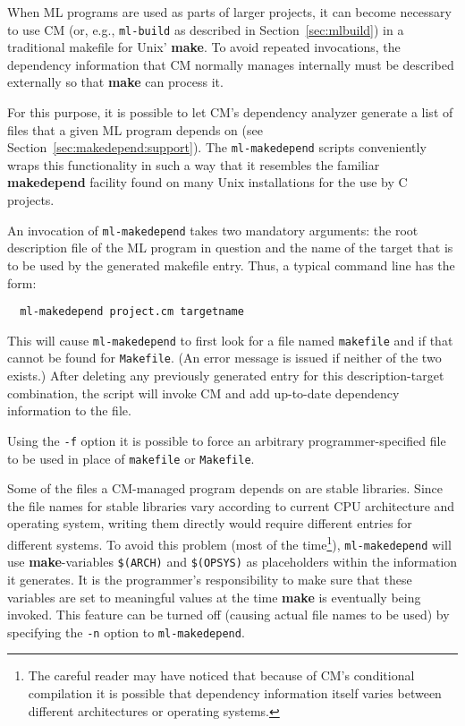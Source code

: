\documentclass[titlepage,letterpaper]{article}
\begin{document}
When ML programs are used as parts of larger projects, it can become
necessary to use CM (or, e.g., {\tt ml-build} as described in
Section~\ref{sec:mlbuild}) in a traditional makefile for Unix' {\bf
make}.  To avoid repeated invocations, the dependency information that
CM normally manages internally must be described externally so that
{\bf make} can process it.

For this purpose, it is possible to let CM's dependency analyzer
generate a list of files that a given ML program depends on (see
Section~\ref{sec:makedepend:support}).  The {\tt ml-makedepend}
scripts conveniently wraps this functionality in such a way that it
resembles the familiar {\bf makedepend} facility found on many Unix
installations for the use by C projects.

An invocation of {\tt ml-makedepend} takes two mandatory arguments:
the root description file of the ML program in question and the name
of the target that is to be used by the generated makefile entry.
Thus, a typical command line has the form:

\begin{verbatim}
  ml-makedepend project.cm targetname
\end{verbatim}

This will cause {\tt ml-makedepend} to first look for a file named
{\tt makefile} and if that cannot be found for {\tt Makefile}.  (An
error message is issued if neither of the two exists.)  After deleting
any previously generated entry for this description-target
combination, the script will invoke CM and add up-to-date dependency
information to the file.

Using the {\tt -f} option it is possible to force an arbitrary
programmer-specified file to be used in place of {\tt makefile} or
{\tt Makefile}.

Some of the files a CM-managed program depends on are stable
libraries.  Since the file names for stable libraries vary according
to current CPU architecture and operating system, writing them
directly would require different entries for different systems.  To
avoid this problem (most of the time\footnote{The careful reader may
have noticed that because of CM's conditional compilation it is
possible that dependency information itself varies between different
architectures or operating systems.}), {\tt ml-makedepend} will use
{\bf make}-variables {\tt \$(ARCH)} and {\tt \$(OPSYS)} as
placeholders within the information it generates.  It is the
programmer's responsibility to make sure that these variables are set
to meaningful values at the time {\bf make} is eventually being
invoked.  This feature can be turned off (causing actual file names to
be used) by specifying the {\tt -n} option to {\tt ml-makedepend}.
\end{document}
